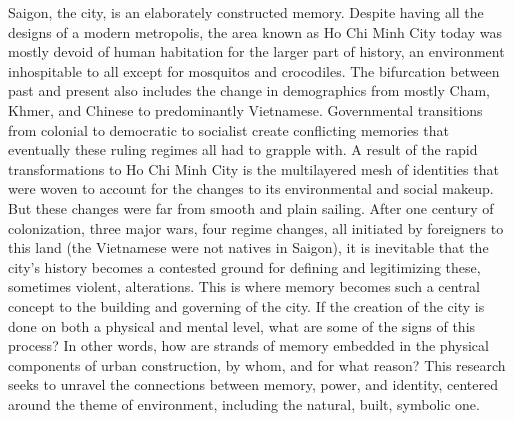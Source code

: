 Saigon, the city, is an elaborately constructed memory.  Despite having all the designs of a modern metropolis, the area known as Ho Chi Minh City today was mostly devoid of human habitation for the larger part of history, an environment inhospitable to all except for mosquitos and crocodiles. The bifurcation between past and present also includes the change in demographics from mostly Cham, Khmer, and Chinese to predominantly Vietnamese. Governmental transitions from colonial to democratic to socialist create conflicting memories that eventually these ruling regimes all had to grapple with. A result of the rapid transformations to Ho Chi Minh City is the multilayered mesh of identities that were woven to account for the changes to its environmental and social makeup. But these changes were far from smooth and plain sailing. After one century of colonization, three major wars, four regime changes, all initiated by foreigners to this land (the Vietnamese were not natives in Saigon), it is inevitable that the city’s history becomes a contested ground for defining and legitimizing these, sometimes violent, alterations. This is where memory becomes such a central concept to the building and governing of the city. If the creation of the city is done on both a physical and mental level, what are some of the signs of this process? In other words, how are strands of memory embedded in the physical components of urban construction, by whom, and for what reason? This research seeks to unravel the connections between memory, power, and identity, centered around the theme of environment, including the natural, built, symbolic one.

